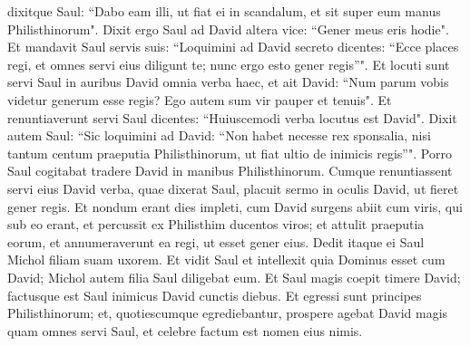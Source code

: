 \begin{biblechapter}
\verse dixitque Saul: “Dabo eam illi, ut fiat ei in scandalum, et sit super eum manus Philisthinorum". Dixit ergo Saul ad David altera vice: “Gener meus eris hodie". 
\verse Et mandavit Saul servis suis: “Loquimini ad David secreto dicentes: “Ecce places regi, et omnes servi eius diligunt te; nunc ergo esto gener regis”". 
\verse Et locuti sunt servi Saul in auribus David omnia verba haec, et ait David: “Num parum vobis videtur generum esse regis? Ego autem sum vir pauper et tenuis". 
\verse Et renuntiaverunt servi Saul dicentes: “Huiuscemodi verba locutus est David". 
\verse Dixit autem Saul: “Sic loquimini ad David: “Non habet necesse rex sponsalia, nisi tantum centum praeputia Philisthinorum, ut fiat ultio de inimicis regis”". Porro Saul cogitabat tradere David in manibus Philisthinorum. 
\verse Cumque renuntiassent servi eius David verba, quae dixerat Saul, placuit sermo in oculis David, ut fieret gener regis. 
\verse Et nondum erant dies impleti, cum David surgens abiit cum viris, qui sub eo erant, et percussit ex Philisthim ducentos viros; et attulit praeputia eorum, et annumeraverunt ea regi, ut esset gener eius. Dedit itaque ei Saul Michol filiam suam uxorem. 
\verse Et vidit Saul et intellexit quia Dominus esset cum David; Michol autem filia Saul diligebat eum.  
\verse Et Saul magis coepit timere David; factusque est Saul inimicus David cunctis diebus. 
\verse Et egressi sunt principes Philisthinorum; et, quotiescumque egrediebantur, prospere agebat David magis quam omnes servi Saul, et celebre factum est nomen eius nimis. 
\end{biblechapter}

